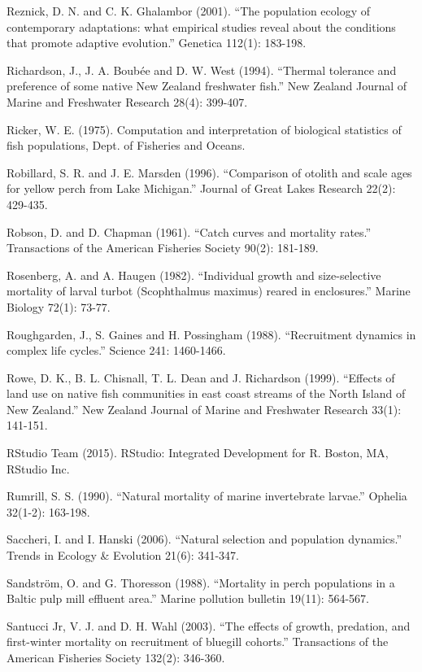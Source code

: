 \documentclass[]{book}
\begin{document}
Reznick, D. N. and C. K. Ghalambor (2001). ``The population ecology of
contemporary adaptations: what empirical studies reveal about the
conditions that promote adaptive evolution.'' Genetica 112(1): 183-198.

Richardson, J., J. A. Boubée and D. W. West (1994). ``Thermal tolerance
and preference of some native New Zealand freshwater fish.'' New Zealand
Journal of Marine and Freshwater Research 28(4): 399-407.

Ricker, W. E. (1975). Computation and interpretation of biological
statistics of fish populations, Dept. of Fisheries and Oceans.

Robillard, S. R. and J. E. Marsden (1996). ``Comparison of otolith and
scale ages for yellow perch from Lake Michigan.'' Journal of Great Lakes
Research 22(2): 429-435.

Robson, D. and D. Chapman (1961). ``Catch curves and mortality rates.''
Transactions of the American Fisheries Society 90(2): 181-189.

Rosenberg, A. and A. Haugen (1982). ``Individual growth and
size-selective mortality of larval turbot (Scophthalmus maximus) reared
in enclosures.'' Marine Biology 72(1): 73-77.

Roughgarden, J., S. Gaines and H. Possingham (1988). ``Recruitment
dynamics in complex life cycles.'' Science 241: 1460-1466.

Rowe, D. K., B. L. Chisnall, T. L. Dean and J. Richardson (1999).
``Effects of land use on native fish communities in east coast streams
of the North Island of New Zealand.'' New Zealand Journal of Marine and
Freshwater Research 33(1): 141-151.

RStudio Team (2015). RStudio: Integrated Development for R. Boston, MA,
RStudio Inc.

Rumrill, S. S. (1990). ``Natural mortality of marine invertebrate
larvae.'' Ophelia 32(1-2): 163-198.

Saccheri, I. and I. Hanski (2006). ``Natural selection and population
dynamics.'' Trends in Ecology \& Evolution 21(6): 341-347.

Sandström, O. and G. Thoresson (1988). ``Mortality in perch populations
in a Baltic pulp mill effluent area.'' Marine pollution bulletin 19(11):
564-567.

Santucci Jr, V. J. and D. H. Wahl (2003). ``The effects of growth,
predation, and first-winter mortality on recruitment of bluegill
cohorts.'' Transactions of the American Fisheries Society 132(2):
346-360.
\end{document}
